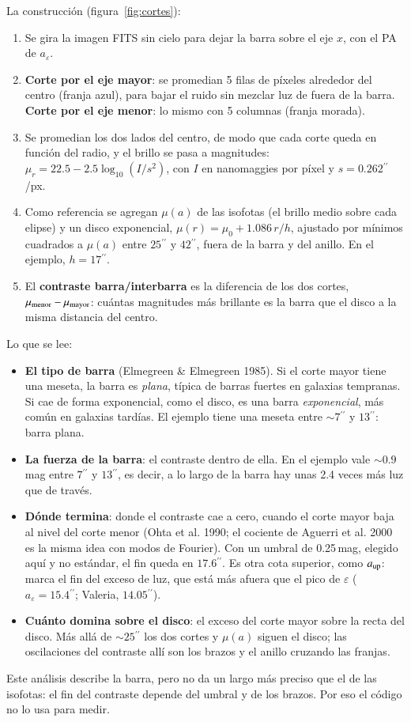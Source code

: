 \documentclass[11pt,a4paper]{article}
\newcommand{\as}{\ensuremath{^{\prime\prime}}}
\newcommand{\aeps}{a_\varepsilon}
\begin{document}
La construcción (figura~\ref{fig:cortes}):
\begin{enumerate}
\item Se gira la imagen FITS sin cielo para dejar la barra sobre el eje $x$, con el PA de $\aeps$.
\item \textbf{Corte por el eje mayor}: se promedian 5 filas de píxeles alrededor del centro (franja azul), para
bajar el ruido sin mezclar luz de fuera de la barra. \textbf{Corte por el eje menor}: lo mismo con 5 columnas
(franja morada).
\item Se promedian los dos lados del centro, de modo que cada corte queda en función del radio, y el brillo se
pasa a magnitudes: $\mu_r = 22.5 - 2.5\log_{10}(I/s^2)$, con $I$ en nanomaggies por píxel y $s = 0.262\as$/px.
\item Como referencia se agregan $\mu(a)$ de las isofotas (el brillo medio sobre cada elipse) y un disco
exponencial, $\mu(r) = \mu_0 + 1.086\,r/h$, ajustado por mínimos cuadrados a $\mu(a)$ entre $25\as$ y $42\as$,
fuera de la barra y del anillo. En el ejemplo, $h = 17\as$.
\item El \textbf{contraste barra/interbarra} es la diferencia de los dos cortes, $\mu_{\rm menor} - \mu_{\rm
mayor}$: cuántas magnitudes más brillante es la barra que el disco a la misma distancia del centro.
\end{enumerate}

Lo que se lee:
\begin{itemize}
\item \textbf{El tipo de barra} (Elmegreen \& Elmegreen 1985). Si el corte mayor tiene una meseta, la barra es
\emph{plana}, típica de barras fuertes en galaxias tempranas. Si cae de forma exponencial, como el disco, es una
barra \emph{exponencial}, más común en galaxias tardías. El ejemplo tiene una meseta entre $\sim 7\as$ y $13\as$:
barra plana.
\item \textbf{La fuerza de la barra}: el contraste dentro de ella. En el ejemplo vale $\sim 0.9$\,mag entre
$7\as$ y $13\as$, es decir, a lo largo de la barra hay unas 2.4 veces más luz que de través.
\item \textbf{Dónde termina}: donde el contraste cae a cero, cuando el corte mayor baja al nivel del corte menor
(Ohta et al. 1990; el cociente de Aguerri et al. 2000 es la misma idea con modos de Fourier). Con un umbral de
0.25\,mag, elegido aquí y no estándar, el fin queda en $17.6\as$. Es otra cota superior, como $a_{\rm up}$: marca
el fin del exceso de luz, que está más afuera que el pico de $\varepsilon$ ($\aeps = 15.4\as$; Valeria,
$14.05\as$).
\item \textbf{Cuánto domina sobre el disco}: el exceso del corte mayor sobre la recta del disco. Más allá de
$\sim 25\as$ los dos cortes y $\mu(a)$ siguen el disco; las oscilaciones del contraste allí son los brazos y el
anillo cruzando las franjas.
\end{itemize}
Este análisis describe la barra, pero no da un largo más preciso que el de las isofotas: el fin del contraste
depende del umbral y de los brazos. Por eso el código no lo usa para medir.
\end{document}
